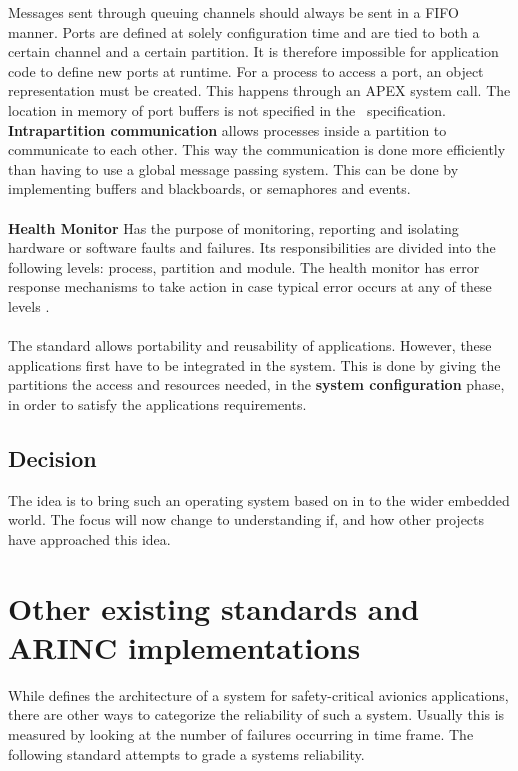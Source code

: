 Messages sent through queuing channels should always be sent in a FIFO manner.
Ports are defined at solely configuration time and are tied to both a certain channel and a certain partition.
It is therefore impossible for application code to define new ports at runtime.
For a process to access a port, an object representation must be created. This happens through an APEX system call.
The location in memory of port buffers is not specified in the \arinc\ specification.
\fi
\textbf{Intrapartition communication}
allows processes inside a partition to communicate to each other. This way
the communication is done more efficiently than having to use a
global message passing system.
This can be done by implementing buffers and blackboards, or semaphores and
events\cite{arinc_page_36}.
\\\\
\textbf{Health Monitor}
Has the purpose of monitoring, reporting and isolating hardware or
software faults and failures. Its responsibilities are divided into
the following levels: process, partition and module. The health monitor has
error response mechanisms to take action in case typical
error occurs at any of these levels
\cite{arinc_page_40}.
\\\\
The standard allows portability and reusability of applications. However,
these applications first have to be integrated in the system. This is done
by giving the partitions the access and resources needed,
in the \textbf{system configuration} phase, in order to
satisfy the applications\textquotesingle{} requirements\cite{arinc_page_42}.

\subsection{Decision}
The idea is to bring such an operating system based on \arinc{}
in to the wider embedded world.
The focus will now change to understanding if, and how other projects
have approached this idea.

\section{Other existing standards and ARINC implementations}
While \arinc{} defines the architecture of a system for safety-critical
avionics applications, there are other ways to categorize the reliability of such a system.
Usually this is measured by looking at the number
of failures occurring in time frame.
The following standard attempts to grade a systems reliability.

